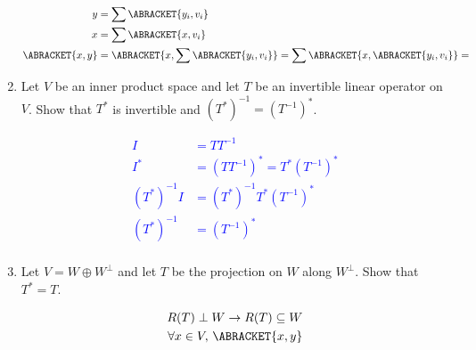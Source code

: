 \documentclass[10pt,a4paper]{report}
\newcommand{\BLUE}[1]{\textcolor{blue}{#1}}
\begin{document}
\begin{enumerate}
	\BLUE{\begin{align*}
		y &= \sum \ABRACKET{y_i, v_i}\\
		x &= \sum \ABRACKET{x, v_i}\\
		\ABRACKET{x,y} &= \ABRACKET{x, \sum \ABRACKET{y_i, v_i}} = \sum \ABRACKET{x,\ABRACKET{y_i, v_i}} = 
	\end{align*}
	}
	
	\item Let $V$ be an inner product space and let $T$ be an invertible linear operator on $V$.  Show that $T^*$ is invertible and $(T^*)^{-1}= (T^{-1})^*$.
	
	\BLUE{\begin{align*}
		I &= TT^{-1} \\
		I^* &= (TT^{-1})^* = T^*(T^{-1})^* \\
		(T^*)^{-1}I &= (T^*)^{-1}T^*(T^{-1})^* \\
		(T^*)^{-1} &= (T^{-1})^* \\
	\end{align*}
	}
	
	\item Let $V = W \oplus W^\perp$ and let $T$ be the projection on $W$ along $W^\perp$.  Show that $T^*=T$.
	
	\BLUE{\begin{align*}
		R(T) \perp W \to R(T) \subseteq W \\
		\forall x\in V, \, \ABRACKET{x,y}
\end{align*}	
	}
	
\end{enumerate}
\end{document}
